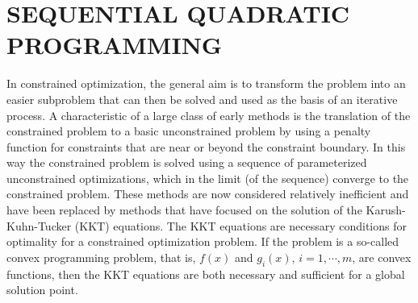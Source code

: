 \documentclass[journal,comsoc]{IEEEtran}
\begin{document}
%



\section{SEQUENTIAL QUADRATIC PROGRAMMING}

In constrained optimization, the general aim is to transform the problem into an easier subproblem that can then be solved and used as the basis of an iterative process. A characteristic of a large class of early methods is the translation of the constrained problem to a basic unconstrained problem by using a penalty function for constraints that are near or beyond the constraint boundary. In this way the constrained problem is solved using a sequence of parameterized unconstrained optimizations, which in the limit (of the sequence) converge to the constrained problem. These methods are now considered relatively inefficient and have been replaced by methods that have focused on the solution of the Karush-Kuhn-Tucker (KKT) equations. The KKT equations are necessary conditions for optimality for a constrained optimization problem. If the problem is a so-called convex programming problem, that is, $f(x)$ and $g_i(x)$, $i = 1,\cdots,m$, are convex functions, then the KKT equations are both necessary and sufficient for a global solution point.
\end{document}
